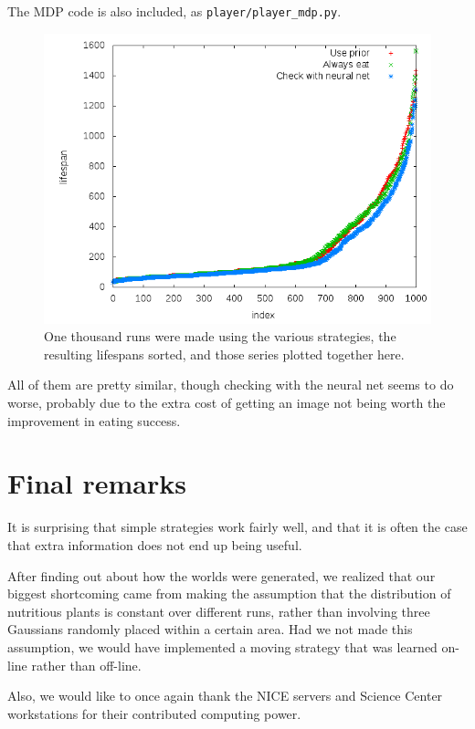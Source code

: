 \documentclass{article}
\begin{document}
The MDP code is also included, as {\tt player/player\_mdp.py}.

\begin{figure}
  \begin{center}
    \includegraphics[width=.9\columnwidth]{comp3.png}
  \end{center}
  \caption{One thousand runs were made using the various strategies,
    the resulting lifespans sorted, and those series plotted together
    here.}
  \label{fig:comparison}
\end{figure}

All of them are pretty similar, though checking with the neural net
seems to do worse, probably due to the extra cost of getting an image
not being worth the improvement in eating success.

\section{Final remarks}
It is surprising that simple strategies work fairly well, and that it
is often the case that extra information does not end up being useful.

After finding out about how the worlds were generated, we realized
that our biggest shortcoming came from making the assumption that the
distribution of nutritious plants is constant over different runs,
rather than involving three Gaussians randomly placed within a certain
area. Had we not made this assumption, we would have implemented a
moving strategy that was learned on-line rather than off-line.

Also, we would like to once again thank the NICE servers and Science
Center workstations for their contributed computing power.
\end{document}
